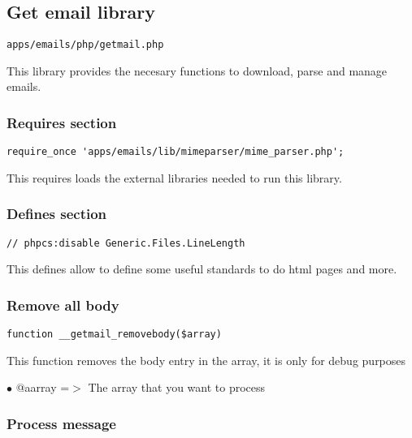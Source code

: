 \documentclass[a4paper]{article}
\begin{document}
\hypertarget{toc72}{}
\subsection{Get email library}

\begin{lstlisting}
apps/emails/php/getmail.php
\end{lstlisting}

This library provides the necesary functions to download, parse and manage emails.

\hypertarget{toc73}{}
\subsubsection{Requires section}

\begin{lstlisting}
require_once 'apps/emails/lib/mimeparser/mime_parser.php';
\end{lstlisting}

This requires loads the external libraries needed to run this library.

\hypertarget{toc74}{}
\subsubsection{Defines section}

\begin{lstlisting}
// phpcs:disable Generic.Files.LineLength
\end{lstlisting}

This defines allow to define some useful standards to do html pages and more.

\hypertarget{toc75}{}
\subsubsection{Remove all body}

\begin{lstlisting}
function __getmail_removebody($array)
\end{lstlisting}

This function removes the body entry in the array, it is only for debug purposes

\begin{compactitem}
\item[\color{myblue}$\bullet$] @aarray =$>$ The array that you want to process
\end{compactitem}

\hypertarget{toc76}{}
\subsubsection{Process message}
\end{document}
